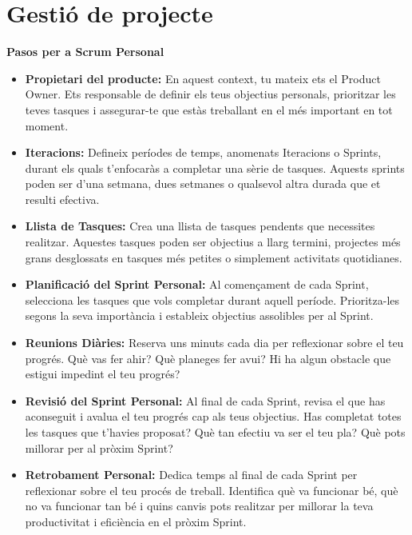 \documentclass[a4paper,12pt,twoside]{ThesisStyle}
\begin{document}
\section{Gestió de projecte}
\label{subsec: Gestió de projecte}


\textbf{Pasos per a Scrum Personal}
\begin{itemize}
    \item \textbf{Propietari del producte: }En aquest context, tu mateix ets el Product Owner. Ets responsable de definir els teus objectius personals, prioritzar les teves tasques i assegurar-te que estàs treballant en el més important en tot moment.
    \item \textbf{Iteracions: }Defineix períodes de temps, anomenats Iteracions o Sprints, durant els quals t'enfocaràs a completar una sèrie de tasques. Aquests sprints poden ser d'una setmana, dues setmanes o qualsevol altra durada que et resulti efectiva.
    \item \textbf{Llista de Tasques: }Crea una llista de tasques pendents que necessites realitzar. Aquestes tasques poden ser objectius a llarg termini, projectes més grans desglossats en tasques més petites o simplement activitats quotidianes.
    \item \textbf{Planificació del Sprint Personal: }Al començament de cada Sprint, selecciona les tasques que vols completar durant aquell període. Prioritza-les segons la seva importància i estableix objectius assolibles per al Sprint.
    \item \textbf{Reunions Diàries: }Reserva uns minuts cada dia per reflexionar sobre el teu progrés. Què vas fer ahir? Què planeges fer avui? Hi ha algun obstacle que estigui impedint el teu progrés?
    \item \textbf{Revisió del Sprint Personal: }Al final de cada Sprint, revisa el que has aconseguit i avalua el teu progrés cap als teus objectius. Has completat totes les tasques que t'havies proposat? Què tan efectiu va ser el teu pla? Què pots millorar per al pròxim Sprint?
    \item \textbf{Retrobament Personal: }Dedica temps al final de cada Sprint per reflexionar sobre el teu procés de treball. Identifica què va funcionar bé, què no va funcionar tan bé i quins canvis pots realitzar per millorar la teva productivitat i eficiència en el pròxim Sprint.
\end{itemize}
\end{document}
